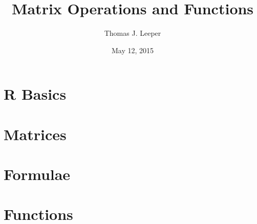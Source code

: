 \documentclass[a4paper,12pt]{article}
\title{Matrix Operations and Functions}
\author{Thomas J. Leeper}
\date{May 12, 2015}
\begin{document}
\maketitle

\doublespacing

\section{R Basics}


\section{Matrices}




\section{Formulae}


\section{Functions}




\end{document}
